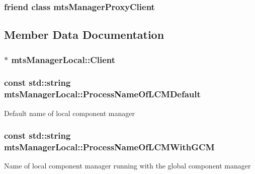 \subsubsection[{mts\+Manager\+Proxy\+Client}]{\setlength{\rightskip}{0pt plus 5cm}friend class mts\+Manager\+Proxy\+Client\hspace{0.3cm}{\ttfamily [friend]}}\label{classmts_manager_local_a6bee6b58692a3a678a2f7543b8158fd3}


\subsection{Member Data Documentation}
\hypertarget{classmts_manager_local_a0e669818ed71b1c33c114f082cc4094d}{}
\subsubsection[{Client}]{$\ast$ mts\+Manager\+Local\+::\+Client}\label{classmts_manager_local_a0e669818ed71b1c33c114f082cc4094d}
\hypertarget{classmts_manager_local_af1eb58312e2aae8668b7cdc00b211c31}{}
\subsubsection[{Process\+Name\+Of\+L\+C\+M\+Default}]{\setlength{\rightskip}{0pt plus 5cm}const std\+::string mts\+Manager\+Local\+::\+Process\+Name\+Of\+L\+C\+M\+Default\hspace{0.3cm}{\ttfamily [static]}}\label{classmts_manager_local_af1eb58312e2aae8668b7cdc00b211c31}
Default name of local component manager \hypertarget{classmts_manager_local_a4210fa8488468453764d5788f6c041a2}{}
\subsubsection[{Process\+Name\+Of\+L\+C\+M\+With\+G\+C\+M}]{\setlength{\rightskip}{0pt plus 5cm}const std\+::string mts\+Manager\+Local\+::\+Process\+Name\+Of\+L\+C\+M\+With\+G\+C\+M\hspace{0.3cm}{\ttfamily [static]}}\label{classmts_manager_local_a4210fa8488468453764d5788f6c041a2}
Name of local component manager running with the global component manager \hypertarget{classmts_manager_local_ab191b8b4a89a550336c9ce2273b5fd49}{}

